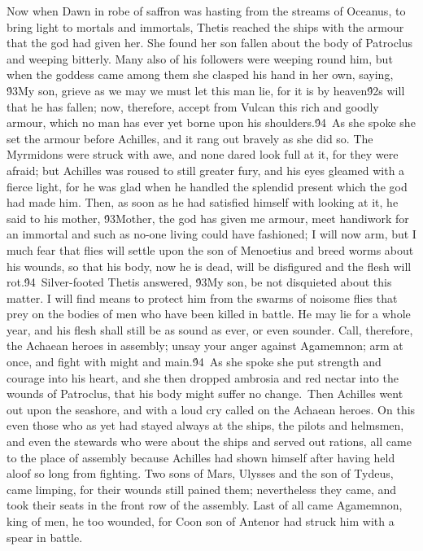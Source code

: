 {  Now when Dawn in robe of saffron was hasting from the streams of Oceanus, to bring light to mortals and immortals, Thetis reached the ships with the armour that the god had given her. She found her son fallen about the body of Patroclus and weeping bitterly. Many also of his followers were weeping round him, but when the goddess came among them she clasped his hand in her own, saying, \'93My son, grieve as we may we must let this man lie, for it is by heaven\'92s will that he has fallen; now, therefore, accept from Vulcan this rich and goodly armour, which no man has ever yet borne upon his shoulders.\'94\
As she spoke she set the armour before Achilles, and it rang out bravely as she did so. The Myrmidons were struck with awe, and none dared look full at it, for they were afraid; but Achilles was roused to still greater fury, and his eyes gleamed with a fierce light, for he was glad when he handled the splendid present which the god had made him. Then, as soon as he had satisfied himself with looking at it, he said to his mother, \'93Mother, the god has given me armour, meet handiwork for an immortal and such as no-one living could have fashioned; I will now arm, but I much fear that flies will settle upon the son of Menoetius and breed worms about his wounds, so that his body, now he is dead, will be disfigured and the flesh will rot.\'94\
Silver-footed Thetis answered, \'93My son, be not disquieted about this matter. I will find means to protect him from the swarms of noisome flies that prey on the bodies of men who have been killed in battle. He may lie for a whole year, and his flesh shall still be as sound as ever, or even sounder. Call, therefore, the Achaean heroes in assembly; unsay your anger against Agamemnon; arm at once, and fight with might and main.\'94\
As she spoke she put strength and courage into his heart, and she then dropped ambrosia and red nectar into the wounds of Patroclus, that his body might suffer no change.\
Then Achilles went out upon the seashore, and with a loud cry called on the Achaean heroes. On this even those who as yet had stayed always at the ships, the pilots and helmsmen, and even the stewards who were about the ships and served out rations, all came to the place of assembly because Achilles had shown himself after having held aloof so long from fighting. Two sons of Mars, Ulysses and the son of Tydeus, came limping, for their wounds still pained them; nevertheless they came, and took their seats in the front row of the assembly. Last of all came Agamemnon, king of men, he too wounded, for Coon son of Antenor had struck him with a spear in battle.\
}
